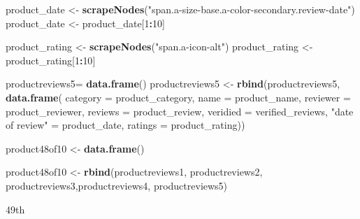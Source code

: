 \documentclass[
]{article}
\newenvironment{Shaded}{\begin{snugshade}}{\end{snugshade}}
\newcommand{\AttributeTok}[1]{\textcolor[rgb]{0.13,0.29,0.53}{#1}}
\newcommand{\DecValTok}[1]{\textcolor[rgb]{0.00,0.00,0.81}{#1}}
\newcommand{\FunctionTok}[1]{\textcolor[rgb]{0.13,0.29,0.53}{\textbf{#1}}}
\newcommand{\NormalTok}[1]{#1}
\newcommand{\OtherTok}[1]{\textcolor[rgb]{0.56,0.35,0.01}{#1}}
\newcommand{\SpecialCharTok}[1]{\textcolor[rgb]{0.81,0.36,0.00}{\textbf{#1}}}
\newcommand{\StringTok}[1]{\textcolor[rgb]{0.31,0.60,0.02}{#1}}
\begin{document}
\begin{Shaded}
\begin{Highlighting}[]
\NormalTok{  product\_date }\OtherTok{\textless{}{-}} \FunctionTok{scrapeNodes}\NormalTok{(}\StringTok{"span.a{-}size{-}base.a{-}color{-}secondary.review{-}date"}\NormalTok{)}
\NormalTok{  product\_date }\OtherTok{\textless{}{-}}\NormalTok{ product\_date[}\DecValTok{1}\SpecialCharTok{:}\DecValTok{10}\NormalTok{]}
  
\NormalTok{  product\_rating }\OtherTok{\textless{}{-}} \FunctionTok{scrapeNodes}\NormalTok{(}\StringTok{"span.a{-}icon{-}alt"}\NormalTok{)}
\NormalTok{  product\_rating }\OtherTok{\textless{}{-}}\NormalTok{ product\_rating[}\DecValTok{1}\SpecialCharTok{:}\DecValTok{10}\NormalTok{]}
  
\NormalTok{  productreviews5}\OtherTok{=} \FunctionTok{data.frame}\NormalTok{()}
\NormalTok{  productreviews5 }\OtherTok{\textless{}{-}} \FunctionTok{rbind}\NormalTok{(productreviews5, }\FunctionTok{data.frame}\NormalTok{(}
                      \AttributeTok{category =}\NormalTok{ product\_category,}
                      \AttributeTok{name =}\NormalTok{ product\_name,}
                      \AttributeTok{reviewer =}\NormalTok{ product\_reviewer,}
                      \AttributeTok{reviews =}\NormalTok{ product\_review,}
                      \AttributeTok{veridied =}\NormalTok{ verified\_reviews,}
                      \StringTok{"date of review"} \OtherTok{=}\NormalTok{ product\_date,}
                      \AttributeTok{ratings =}\NormalTok{ product\_rating))}
  
\NormalTok{  product48of10 }\OtherTok{\textless{}{-}} \FunctionTok{data.frame}\NormalTok{()}
  
\NormalTok{  product48of10 }\OtherTok{\textless{}{-}} \FunctionTok{rbind}\NormalTok{(productreviews1, productreviews2, productreviews3,productreviews4, productreviews5)}
\end{Highlighting}
\end{Shaded}

49th
\end{document}
